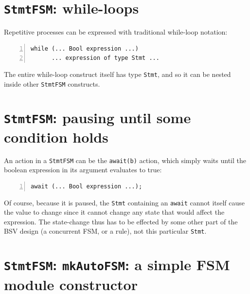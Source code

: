 
\section{{\tt StmtFSM}: while-loops}


Repetitive processes can be expressed with traditional while-loop notation:

{\small
\begin{Verbatim}[frame=single, numbers=left]
   while (... Bool expression ...)
      ... expression of type Stmt ...
\end{Verbatim}
}

The entire while-loop construct itself has type \verb|Stmt|, and so it
can be nested inside other \verb|StmtFSM| constructs.


\section{{\tt StmtFSM}: pausing until some condition holds}


An action in a \verb|StmtFSM| can be the \verb|await(b)| action, which
simply waits until the boolean expression in its argument evaluates to
true:

{\small
\begin{Verbatim}[frame=single, numbers=left]
   await (... Bool expression ...);
\end{Verbatim}
}

Of course, because it is paused, the \verb|Stmt| containing an
\verb|await| cannot itself cause the value to change since it cannot
change any state that would affect the expression.  The state-change
thus has to be effected by some other part of the BSV design (a
concurrent FSM, or a rule), not this particular \verb|Stmt|.


\section{{\tt StmtFSM}: {\tt mkAutoFSM}: a simple FSM module constructor}

